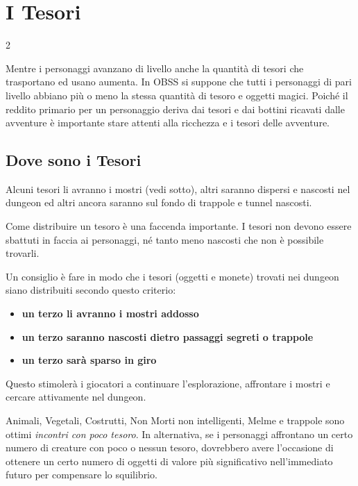 \section{I Tesori}\label{disporretesori}

\begin{multicols}{2}

Mentre i personaggi avanzano di livello anche la quantità di tesori che trasportano ed usano aumenta. In OBSS si suppone che tutti i personaggi di pari livello abbiano più o meno la stessa quantità di tesoro e oggetti magici. Poiché il reddito primario per un personaggio deriva dai tesori e dai bottini ricavati dalle avventure è importante stare attenti alla ricchezza e i tesori delle avventure.

\subsection{Dove sono i Tesori}

Alcuni tesori li avranno i mostri (vedi sotto), altri saranno dispersi e nascosti nel dungeon ed altri ancora saranno sul fondo di trappole e tunnel nascosti.

Come distribuire un tesoro è una faccenda importante. I tesori non devono essere sbattuti in faccia ai personaggi, né tanto meno nascosti che non è possibile trovarli.

Un consiglio è fare in modo che i tesori (oggetti e monete) trovati nei dungeon siano distribuiti secondo questo criterio:

\begin{itemize}[leftmargin=*] \setlength{\itemsep}{0pt}
\item \textbf{un terzo li avranno i mostri addosso}
\item \textbf{un terzo saranno nascosti dietro passaggi segreti o trappole}
\item \textbf{un terzo sarà sparso in giro}
\end{itemize}

Questo stimolerà i giocatori a continuare l'esplorazione, affrontare i mostri e cercare attivamente nel dungeon.

Animali, Vegetali, Costrutti, Non Morti non intelligenti, Melme e trappole sono ottimi \emph{incontri con poco tesoro}.
In alternativa, se i personaggi affrontano un certo numero di creature con poco o nessun tesoro, dovrebbero avere l'occasione di ottenere un certo numero di oggetti di valore più significativo nell'immediato futuro per compensare lo squilibrio.


\end{multicols}
